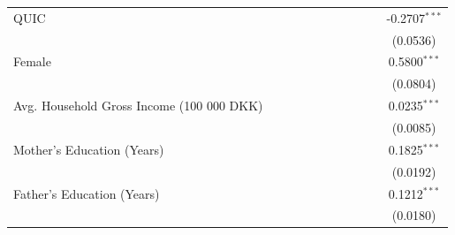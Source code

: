 \begin{tabular}{lcccccccccc}
   QUIC                                      &                 &                 &                 &                 &                 &                 &               &                        &                 & -0.2707$^{***}$\\   
                                             &                 &                 &                 &                 &                 &                 &               &                        &                 & (0.0536)\\   
   Female                                    &                 &                 &                 &                 &                 &                 &               &                        &                 & 0.5800$^{***}$\\   
                                             &                 &                 &                 &                 &                 &                 &               &                        &                 & (0.0804)\\   
   Avg. Household Gross Income (100 000 DKK) &                 &                 &                 &                 &                 &                 &               &                        &                 & 0.0235$^{***}$\\   
                                             &                 &                 &                 &                 &                 &                 &               &                        &                 & (0.0085)\\   
   Mother's Education (Years)                &                 &                 &                 &                 &                 &                 &               &                        &                 & 0.1825$^{***}$\\   
                                             &                 &                 &                 &                 &                 &                 &               &                        &                 & (0.0192)\\   
   Father's Education (Years)                &                 &                 &                 &                 &                 &                 &               &                        &                 & 0.1212$^{***}$\\   
                                             &                 &                 &                 &                 &                 &                 &               &                        &                 & (0.0180)\\   

\end{tabular}
